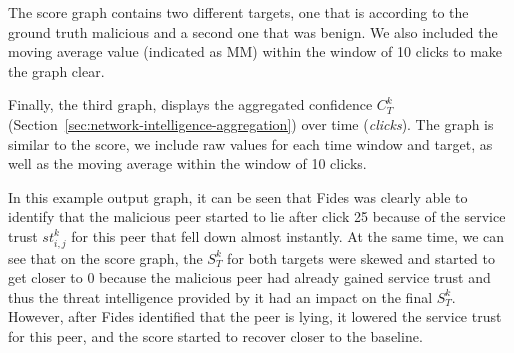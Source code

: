 The score graph contains two different targets, one that is according to the ground truth malicious and a second one that was benign.
We also included the moving average value (indicated as MM) within the window of 10 clicks to make the graph clear.

Finally, the third graph, displays the aggregated confidence $C^{k}_{T}$ (Section~\ref{sec:network-intelligence-aggregation}) over time (\textit{clicks}).
The graph is similar to the score, we include raw values for each time window and target, as well as the moving average within the window of 10 clicks.

In this example output graph, it can be seen that Fides was clearly able to identify that the malicious peer started to lie after click 25 because of the service trust $st^{k}_{i,j}$ for this peer that fell down almost instantly.
At the same time, we can see that on the score graph, the $S^{k}_{T}$ for both targets were skewed and started to get closer to $0$ because the malicious peer had already gained service trust and thus the threat intelligence provided by it had an impact on the final $S^{k}_{T}$.
However, after Fides identified that the peer is lying, it lowered the service trust for this peer, and the score started to recover closer to the baseline.